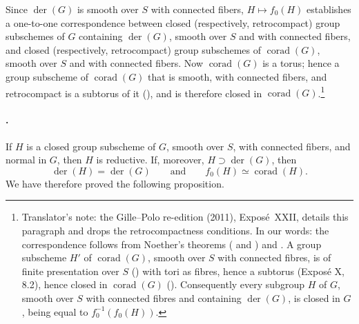 Since \(\operatorname{der}(G)\) is smooth over \(S\) with
connected fibers, \(H\mapsto f_0(H)\) establishes a one-to-one
correspondence between closed \textup{(respectively, retrocompact)}
group subschemes of \(G\) containing \(\operatorname{der}(G)\),
smooth over \(S\) and with connected fibers, and closed
\textup{(respectively, retrocompact)} group subschemes of
\(\operatorname{corad}(G)\), smooth over \(S\) and with connected
fibers. Now \(\operatorname{corad}(G)\) is a torus; hence a group
subscheme of \(\operatorname{corad}(G)\) that is smooth, with
connected fibers, and retrocompact is a subtorus of it
\textup{()}, and is therefore closed in
\(\operatorname{corad}(G)\).\footnote{Translator's note: the Gille--Polo re-edition (2011), Exposé~XXII, details this paragraph
and drops the retrocompactness conditions. In our words: the correspondence
follows from Noether's theorems ( and ) and
. A group subscheme \(H'\) of \(\operatorname{corad}(G)\),
smooth over \(S\) with connected fibres, is of finite presentation over \(S\)
() with tori as fibres, hence a subtorus (Exposé X, 8.2), hence
closed in \(\operatorname{corad}(G)\) (). Consequently every subgroup
\(H\) of \(G\), smooth over \(S\) with connected fibres and containing
\(\operatorname{der}(G)\), is closed in \(G\), being equal to
\(f_0^{-1}(f_0(H))\).}

\paragraph{.}
If \(H\) is a closed group subscheme of \(G\), smooth over \(S\),
with connected fibers, and normal in \(G\), then \(H\) is
reductive. If, moreover, \(H\supset\operatorname{der}(G)\), then
\[
  \operatorname{der}(H)=\operatorname{der}(G)
  \qquad\text{and}\qquad
  f_0(H)\simeq\operatorname{corad}(H).
\]
We have therefore proved the following proposition.

